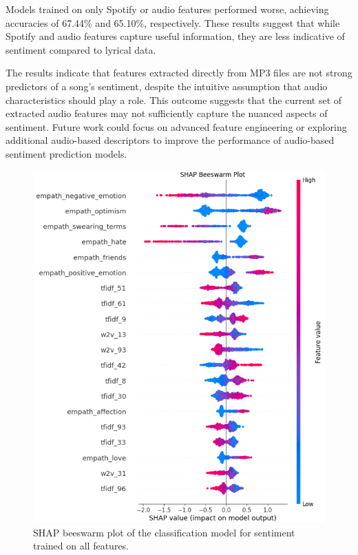 Models trained on only Spotify or audio features performed worse, achieving
accuracies of 67.44\% and 65.10\%, respectively. These results suggest that
while Spotify and audio features capture useful information, they are less
indicative of sentiment compared to lyrical data. 

The results indicate that features extracted directly from MP3 files are not
strong predictors of a song's sentiment, despite the intuitive assumption that
audio characteristics should play a role. This outcome suggests that the
current set of extracted audio features may not sufficiently capture the
nuanced aspects of sentiment. Future work could focus on advanced feature
engineering or exploring additional audio-based descriptors to improve the
performance of audio-based sentiment prediction models.

\begin{center}
\begin{figure}[H]
  \centering
  \includegraphics[width=5in]{img/beeswarm_sentiment.png}
  \caption{SHAP beeswarm plot of the classification model for sentiment
  trained on all features.}
  \label{Figure:fig_bh}
\end{figure}
\end{center}

